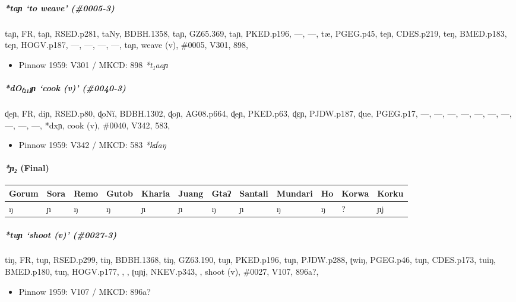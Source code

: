 \documentclass[a4paper,]{article}
\providecommand{\tightlist}{%
  \setlength{\itemsep}{0pt}\setlength{\parskip}{0pt}}
\let\oldparagraph\paragraph
\renewcommand{\paragraph}[1]{\oldparagraph{#1}\mbox{}}
\let\oldsubparagraph\subparagraph
\renewcommand{\subparagraph}[1]{\oldsubparagraph{#1}\mbox{}}
\begin{document}
\subparagraph{\texorpdfstring{\emph{*taɲ} `to weave'
(\#0005-3)}{*taɲ to weave (\#0005-3)}}\label{taux272-to-weave-0005-3}

taɲ, FR, taɲ, RSED.p281, taNy, BDBH.1358, taɲ, GZ65.369, taɲ, PKED.p196,
---, ---, tæ, PGEG.p45, teɲ, CDES.p219, teŋ, BMED.p183, teɲ, HOGV.p187,
---, ---, ---, ---, taɲ, weave (v), \#0005, V301, 898,

\begin{itemize}
\tightlist
\item
  Pinnow 1959: V301 / MKCD: 898 \emph{*t₁aaɲ}
\end{itemize}

\subparagraph{\texorpdfstring{\emph{*dO₍₂₁₎ɲ} `cook (v)'
(\#0040-3)}{*dO₍₂₁₎ɲ cook (v) (\#0040-3)}}\label{doux272-cook-v-0040-3}

ɖeɲ, FR, diɲ, RSED.p80, ɖoNĭ, BDBH.1302, ɖoɲ, AG08.p664, ɖeɲ, PKED.p63,
ɖɛɲ, PJDW.p187, ɖue, PGEG.p17, ---, ---, ---, ---, ---, ---, ---, ---,
---, ---, *dxɲ, cook (v), \#0040, V342, 583,

\begin{itemize}
\tightlist
\item
  Pinnow 1959: V342 / MKCD: 583 \emph{*kɗaŋ}
\end{itemize}

\paragraph{\texorpdfstring{\emph{*ɲ₂}
(Final)}{*ɲ₂ (Final)}}\label{ux272-final-1}

\begin{longtable}[]{@{}llllllllllll@{}}
\toprule
Gorum & Sora & Remo & Gutob & Kharia & Juang & Gtaʔ & Santali & Mundari
& Ho & Korwa & Korku\tabularnewline
\midrule
\endhead
ŋ & ɲ & ŋ & ŋ & ɲ & ɲ & ŋ & ɲ & ŋ & ŋ & ? & ɲj\tabularnewline
\bottomrule
\end{longtable}

\subparagraph{\texorpdfstring{\emph{*tuɲ} `shoot (v)'
(\#0027-3)}{*tuɲ shoot (v) (\#0027-3)}}\label{tuux272-shoot-v-0027-3}

tiŋ, FR, tuɲ, RSED.p299, tiŋ, BDBH.1368, tiŋ, GZ63.190, tuɲ, PKED.p196,
tuɲ, PJDW.p288, ʈwiŋ, PGEG.p46, tuɲ, CDES.p173, tuiŋ, BMED.p180, tuŋ,
HOGV.p177, , , ʈuɲj, NKEV.p343, , shoot (v), \#0027, V107, 896a?,

\begin{itemize}
\tightlist
\item
  Pinnow 1959: V107 / MKCD: 896a?
\end{itemize}
\end{document}
